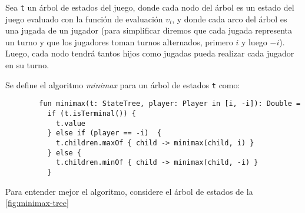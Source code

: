     \begin{definition}
      Sea \texttt{t} un árbol de estados del juego, donde cada nodo del árbol es un estado del juego
      evaluado con la función de evaluación \(v_i\), y donde cada arco del árbol es una jugada de un
      jugador (para simplificar diremos que cada jugada representa un turno y que los jugadores 
      toman turnos alternados, primero \(i\) y luego \(-i\)).
      Luego, cada nodo tendrá tantos hijos como jugadas pueda realizar cada jugador en su turno.

      Se define el algoritmo \textit{minimax} para un árbol de estados \texttt{t} como:
      
      \begin{verbatim}
        fun minimax(t: StateTree, player: Player in [i, -i]): Double =
          if (t.isTerminal()) {
            t.value
          } else if (player == -i)  {
            t.children.maxOf { child -> minimax(child, i) }
          } else {
            t.children.minOf { child -> minimax(child, -i) }
          } 
      \end{verbatim}

      \begin{figure}
        
      \end{figure}
      Para entender mejor el algoritmo, considere el árbol de estados de la \cref{fig:minimax-tree}

    \end{definition}